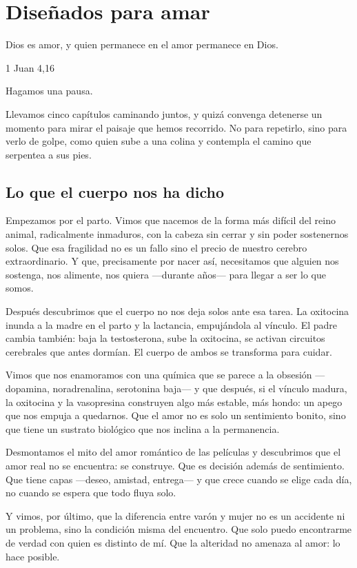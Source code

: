 \chapter{Diseñados para amar}

\epigraph{Dios es amor, y quien permanece en el amor permanece en Dios.}{1 Juan 4,16}

Hagamos una pausa.

Llevamos cinco capítulos caminando juntos, y quizá convenga detenerse un momento para mirar el paisaje que hemos recorrido. No para repetirlo, sino para verlo de golpe, como quien sube a una colina y contempla el camino que serpentea a sus pies.

\section{Lo que el cuerpo nos ha dicho}

Empezamos por el parto. Vimos que nacemos de la forma más difícil del reino animal, radicalmente inmaduros, con la cabeza sin cerrar y sin poder sostenernos solos. Que esa fragilidad no es un fallo sino el precio de nuestro cerebro extraordinario. Y que, precisamente por nacer así, necesitamos que alguien nos sostenga, nos alimente, nos quiera ---durante años--- para llegar a ser lo que somos.

Después descubrimos que el cuerpo no nos deja solos ante esa tarea. La oxitocina inunda a la madre en el parto y la lactancia, empujándola al vínculo. El padre cambia también: baja la testosterona, sube la oxitocina, se activan circuitos cerebrales que antes dormían. El cuerpo de ambos se transforma para cuidar.

Vimos que nos enamoramos con una química que se parece a la obsesión ---dopamina, noradrenalina, serotonina baja--- y que después, si el vínculo madura, la oxitocina y la vasopresina construyen algo más estable, más hondo: un apego que nos empuja a quedarnos. Que el amor no es solo un sentimiento bonito, sino que tiene un sustrato biológico que nos inclina a la permanencia.

Desmontamos el mito del amor romántico de las películas y descubrimos que el amor real no se encuentra: se construye. Que es decisión además de sentimiento. Que tiene capas ---deseo, amistad, entrega--- y que crece cuando se elige cada día, no cuando se espera que todo fluya solo.

Y vimos, por último, que la diferencia entre varón y mujer no es un accidente ni un problema, sino la condición misma del encuentro. Que solo puedo encontrarme de verdad con quien es distinto de mí. Que la alteridad no amenaza al amor: lo hace posible.

